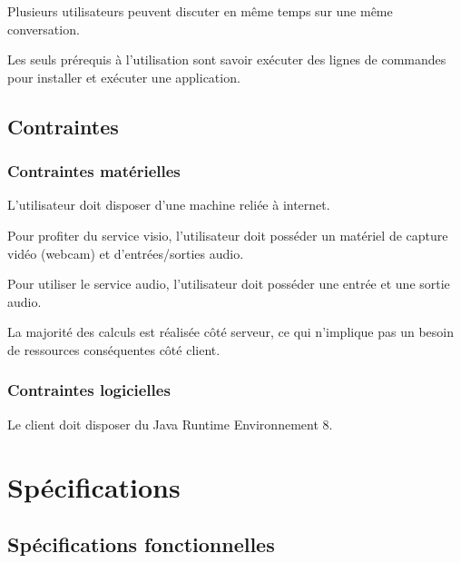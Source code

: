 \documentclass[11pt,dvipsnames,svgnames]{report}
\begin{document}
\begin{mdframed}[topline=false,rightline=false,bottomline=false, linewidth=3pt,linecolor=red]
Plusieurs utilisateurs peuvent discuter en même temps sur une même conversation.
\end{mdframed}

Les seuls prérequis à l'utilisation sont savoir exécuter des lignes de commandes pour installer et exécuter une application.
\section{Contraintes}
\subsection{Contraintes matérielles}
L'utilisateur doit disposer d'une machine reliée à internet.

Pour profiter du service visio, l'utilisateur doit posséder un matériel de capture vidéo (webcam) et d'entrées/sorties audio.

Pour utiliser le service audio, l'utilisateur doit posséder une entrée et une sortie audio.

La majorité des calculs est réalisée côté serveur, ce qui n'implique pas un besoin de ressources conséquentes côté client.

\subsection{Contraintes logicielles}

Le client doit disposer du Java Runtime Environnement 8.

\chapter{Spécifications}

\section{Spécifications fonctionnelles}
\end{document}
